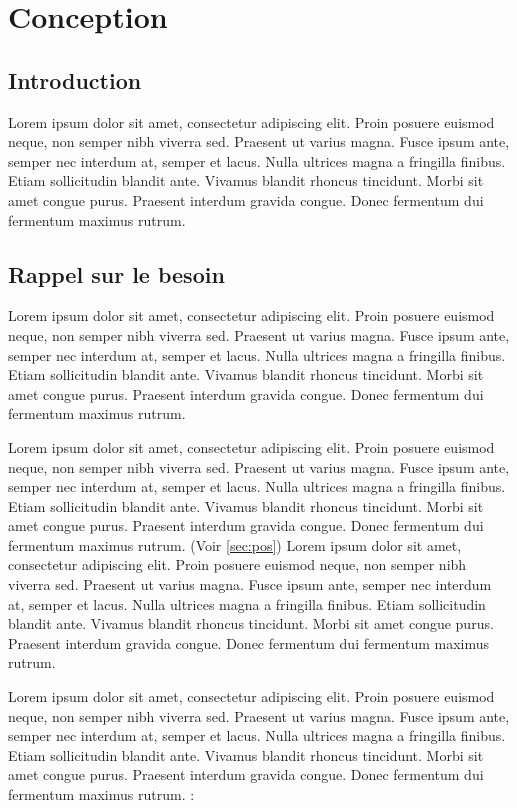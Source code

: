 \chapter{Conception}

\newpage

\section{Introduction}
Lorem ipsum dolor sit amet, consectetur adipiscing elit. Proin posuere euismod neque, non semper nibh viverra sed. Praesent ut varius magna. Fusce ipsum ante, semper nec interdum at, semper et lacus. Nulla ultrices magna a fringilla finibus. Etiam sollicitudin blandit ante. Vivamus blandit rhoncus tincidunt. Morbi sit amet congue purus. Praesent interdum gravida congue. Donec fermentum dui fermentum maximus rutrum.

\section{Rappel sur le besoin}
Lorem ipsum dolor sit amet, consectetur adipiscing elit. Proin posuere euismod neque, non semper nibh viverra sed. Praesent ut varius magna. Fusce ipsum ante, semper nec interdum at, semper et lacus. Nulla ultrices magna a fringilla finibus. Etiam sollicitudin blandit ante. Vivamus blandit rhoncus tincidunt. Morbi sit amet congue purus. Praesent interdum gravida congue. Donec fermentum dui fermentum maximus rutrum.

\medskip

Lorem ipsum dolor sit amet, consectetur adipiscing elit. Proin posuere euismod neque, non semper nibh viverra sed. Praesent ut varius magna. Fusce ipsum ante, semper nec interdum at, semper et lacus. Nulla ultrices magna a fringilla finibus. Etiam sollicitudin blandit ante. Vivamus blandit rhoncus tincidunt. Morbi sit amet congue purus. Praesent interdum gravida congue. Donec fermentum dui fermentum maximus rutrum. (Voir \ref{sec:pos}) Lorem ipsum dolor sit amet, consectetur adipiscing elit. Proin posuere euismod neque, non semper nibh viverra sed. Praesent ut varius magna. Fusce ipsum ante, semper nec interdum at, semper et lacus. Nulla ultrices magna a fringilla finibus. Etiam sollicitudin blandit ante. Vivamus blandit rhoncus tincidunt. Morbi sit amet congue purus. Praesent interdum gravida congue. Donec fermentum dui fermentum maximus rutrum.

\medskip

Lorem ipsum dolor sit amet, consectetur adipiscing elit. Proin posuere euismod neque, non semper nibh viverra sed. Praesent ut varius magna. Fusce ipsum ante, semper nec interdum at, semper et lacus. Nulla ultrices magna a fringilla finibus. Etiam sollicitudin blandit ante. Vivamus blandit rhoncus tincidunt. Morbi sit amet congue purus. Praesent interdum gravida congue. Donec fermentum dui fermentum maximus rutrum. :
\medskip

